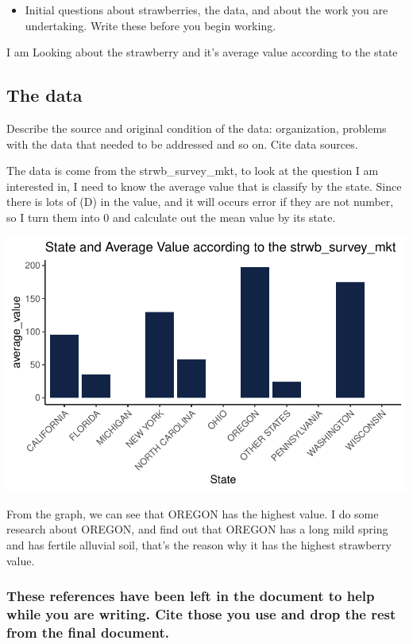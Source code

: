 \documentclass[
  letterpaper,
  DIV=11,
  numbers=noendperiod]{scrartcl}
\providecommand{\tightlist}{%
  \setlength{\itemsep}{0pt}\setlength{\parskip}{0pt}}\usepackage{longtable,booktabs,array}
\begin{document}
\begin{itemize}
\tightlist
\item
  Initial questions about strawberries, the data, and about the work you
  are undertaking. Write these before you begin working.
\end{itemize}

I am Looking about the strawberry and it's average value according to
the state

\hypertarget{the-data}{%
\subsection{The data}\label{the-data}}

Describe the source and original condition of the data: organization,
problems with the data that needed to be addressed and so on. Cite data
sources.

The data is come from the strwb\_survey\_mkt, to look at the question I
am interested in, I need to know the average value that is classify by
the state. Since there is lots of (D) in the value, and it will occurs
error if they are not number, so I turn them into 0 and calculate out
the mean value by its state.

\includegraphics{USDA-NASS-data-cleaning-oct11_files/figure-pdf/unnamed-chunk-27-1.pdf}

From the graph, we can see that OREGON has the highest value. I do some
research about OREGON, and find out that OREGON has a long mild spring
and has fertile alluvial soil, that's the reason why it has the highest
strawberry value.

\hypertarget{these-references-have-been-left-in-the-document-to-help-while-you-are-writing.-cite-those-you-use-and-drop-the-rest-from-the-final-document.}{%
\subsubsection{These references have been left in the document to help
while you are writing. Cite those you use and drop the rest from the
final
document.}\label{these-references-have-been-left-in-the-document-to-help-while-you-are-writing.-cite-those-you-use-and-drop-the-rest-from-the-final-document.}}
\end{document}
